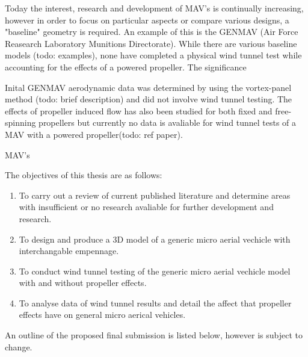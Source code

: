 \label{subsec:The General Micro Aerial Vechicle}
Today the interest, research and development of MAV's is continually increasing, however in order to focus on particular aspects or compare various designs, a "baseline" geometry is required. An example of this is the GENMAV (Air Force Reasearch Laboratory Munitions Directorate). While there are various baseline models (todo: examples), none have completed a physical wind tunnel test while accounting for the effects of a powered propeller. The significance

\label{subsec:Optimization Techniques and Validation}
Inital GENMAV aerodynamic data was determined by using the vortex-panel method (todo: brief description) and did not involve wind tunnel testing. The effects of propeller induced flow has also been studied for both fixed and free-spinning propellers but currently no data is avaliable for wind tunnel tests of a MAV with a powered propeller(todo: ref paper). 
\label{sec:Problem Statement}

MAV's




\label{sec:Objectives}
The objectives of this thesis are as follows:

\begin{enumerate}
  \item To carry out a review of current published literature and determine areas with insufficient or no research avaliable for further development and research.
  \item To design and produce a 3D model of a generic micro aerial vechicle with interchangable empennage.
  \item To conduct wind tunnel testing of the generic micro aerial vechicle model with and without propeller effects.
  \item To analyse data of wind tunnel results and detail the affect that propeller effects have on general micro aerical vehicles.
\end{enumerate}

\label{sec:Outline}
An outline of the proposed final submission is listed below, however is subject to change.

